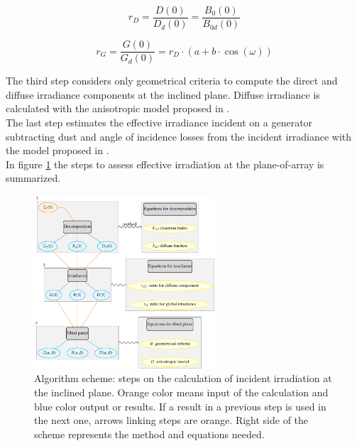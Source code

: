 \begin{equation}\label{ratioB0}
r_{D}=\frac{D(0)}{D_d(0)}=\frac{B_0(0)}{B_{0d}(0)}
\end{equation}


\begin{equation}\label{ratioG0}
r_G=\frac{G(0)}{G_d(0)}=r_D\cdot(a+b\cdot\cos(\omega))
\end{equation}


The third step considers only geometrical criteria to compute the direct and diffuse irradiance components at the inclined plane. Diffuse irradiance is calculated with the anisotropic model proposed in \cite{hay1985estimating}.\\ 

The last step estimates the effective irradiance incident on a generator subtracting dust and angle of incidence losses from the incident irradiance with the model proposed in \cite{Martin2001}.\\

In figure \ref{fig:algorithm_outline} the steps to assess effective irradiation at the plane-of-array is summarized.

\begin{figure}
  \centering
  \includegraphics[width=0.6\textwidth]{figs/algorithm_outline}
  \caption{Algorithm scheme: steps on the calculation of incident irradiation at the inclined plane. Orange color means input of the calculation and blue color output or results. If a result in a previous step is used in the next one, arrows linking steps are orange. Right side of the scheme represents the method and equations needed.}
 \label{fig:algorithm_outline}
\end{figure}

